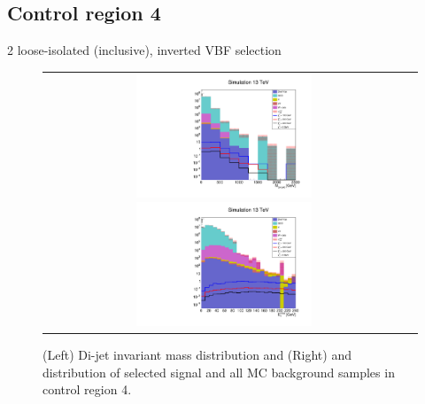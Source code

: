 \subsection*{Control region 4}

\FloatBarrier

2 loose-isolated \hadtau (inclusive), inverted VBF selection

\begin{figure}[tbh!]
	\centering
	\begin{tabular}{cc}
		\includegraphics[width=0.5\textwidth]{analysis/pics/h_dijetinvariantmass_Tau2LooseIsoInclusiveVBFInverted.pdf}
		\includegraphics[width=0.5\textwidth]{analysis/pics/h_met_Tau2LooseIsoInclusiveVBFInverted.pdf}
	\end{tabular}
	\caption{(Left) Di-jet invariant mass distribution and (Right) and \met distribution of selected signal and all MC background samples in control region 4.}
	\label{fig::crplots1_Tau2LooseIsoInclusiveVBFInverted_13tev}
\end{figure}

